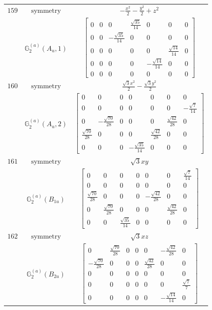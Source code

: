 \documentclass[fleqn,8pt,landscape]{jsarticle}
\begin{document}
\begin{longtable}{ccc}
$ 159 $ & $ \text{symmetry} $ & $ - \frac{x^{2}}{2} - \frac{y^{2}}{2} + z^{2} $ \\
$  $ & $ \mathbb{G}_{2}^{(a)}(A_{u},1) $ & $ \begin{bmatrix} 0 & 0 & 0 & \frac{\sqrt{35}}{14} & 0 & 0 & 0 \\ 0 & 0 & - \frac{\sqrt{35}}{14} & 0 & 0 & 0 & 0 \\ 0 & 0 & 0 & 0 & 0 & \frac{\sqrt{14}}{14} & 0 \\ 0 & 0 & 0 & 0 & - \frac{\sqrt{14}}{14} & 0 & 0 \\ 0 & 0 & 0 & 0 & 0 & 0 & 0 \end{bmatrix} $ \\ \hline
$ 160 $ & $ \text{symmetry} $ & $ \frac{\sqrt{3} x^{2}}{2} - \frac{\sqrt{3} y^{2}}{2} $ \\
$  $ & $ \mathbb{G}_{2}^{(a)}(A_{u},2) $ & $ \begin{bmatrix} 0 & 0 & 0 & 0 & 0 & 0 & 0 \\ 0 & 0 & 0 & 0 & 0 & 0 & - \frac{\sqrt{7}}{14} \\ 0 & - \frac{\sqrt{70}}{28} & 0 & 0 & 0 & \frac{\sqrt{42}}{28} & 0 \\ \frac{\sqrt{70}}{28} & 0 & 0 & 0 & \frac{\sqrt{42}}{28} & 0 & 0 \\ 0 & 0 & 0 & - \frac{\sqrt{35}}{14} & 0 & 0 & 0 \end{bmatrix} $ \\ \hline
$ 161 $ & $ \text{symmetry} $ & $ \sqrt{3} x y $ \\
$  $ & $ \mathbb{G}_{2}^{(a)}(B_{1u}) $ & $ \begin{bmatrix} 0 & 0 & 0 & 0 & 0 & 0 & \frac{\sqrt{7}}{14} \\ 0 & 0 & 0 & 0 & 0 & 0 & 0 \\ \frac{\sqrt{70}}{28} & 0 & 0 & 0 & - \frac{\sqrt{42}}{28} & 0 & 0 \\ 0 & \frac{\sqrt{70}}{28} & 0 & 0 & 0 & \frac{\sqrt{42}}{28} & 0 \\ 0 & 0 & \frac{\sqrt{35}}{14} & 0 & 0 & 0 & 0 \end{bmatrix} $ \\ \hline
$ 162 $ & $ \text{symmetry} $ & $ \sqrt{3} x z $ \\
$  $ & $ \mathbb{G}_{2}^{(a)}(B_{2u}) $ & $ \begin{bmatrix} 0 & \frac{\sqrt{70}}{28} & 0 & 0 & 0 & - \frac{\sqrt{42}}{28} & 0 \\ - \frac{\sqrt{70}}{28} & 0 & 0 & 0 & \frac{\sqrt{42}}{28} & 0 & 0 \\ 0 & 0 & 0 & 0 & 0 & 0 & 0 \\ 0 & 0 & 0 & 0 & 0 & 0 & \frac{\sqrt{7}}{7} \\ 0 & 0 & 0 & 0 & 0 & - \frac{\sqrt{14}}{14} & 0 \end{bmatrix} $ \\ \hline

\end{longtable}
\end{document}

